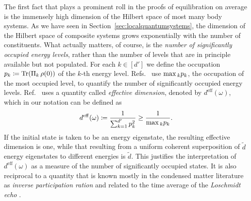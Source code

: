 \documentclass[a4paper,12pt,listof=totoc,index=totoc,bibliography=totoc,headsepline=false,headings=normal,BCOR16.153846mm,DIV12,headinclude,twoside,cleardoublepage=empty,numbers=noenddot,final]{scrreprt}
\theoremstyle{mystyle}
\numberwithin{equation}{section}
\numberwithin{figure}{section}
\numberwithin{lemma}{section}
\numberwithin{theorem}{section}
\numberwithin{corollary}{section}
\numberwithin{definition}{section}
\numberwithin{conjecture}{section}
\numberwithin{observation}{section}
\newcommand{\+}{\mkern2mu}
\newcommand{\coloneqq}{\mathrel{\vcentcolon\mkern-1.2mu=}} %
\renewcommand{\max}{\mathchoice{\operatorname*{max}}{\operatorname*{max}}{\mathrm{max}}{\mathrm{max}}} %
\newcommand{\deff}{d^{\mathrm{eff}}}
\DeclareMathOperator{\1}{\mathds{1}}
\DeclareMathOperator{\Tr}{Tr}
\begin{document}
The first fact that plays a prominent roll in the proofs of equilibration on average is the immensely high dimension of the Hilbert space of most many body systems.
As we have seen in Section~\ref{sec:localquantumsystems}, the dimension of the Hilbert space of composite systems grows exponentially with the number of constituents.
What actually matters, of course, is the \emph{number of significantly occupied energy levels}, rather than the number of levels that are in principle available but not populated.
For each $k \in [d']$ we define the occupation $p_k \coloneqq \Tr(\Pi_k\,\rho(0))$ of the $k$-th energy level.
Refs.~\cite{tasaki98,Reimann08} use $\max_k p_k$, the occupation of the most occupied level, to quantify the number of significantly occupied energy levels.
Ref.~\cite{Linden09} uses a quantity called \emph{effective dimension}, denoted by $\deff(\omega)$, which in our notation can be defined as
\begin{equation} \label{eq:effectivedimension}
  \deff(\omega) \coloneqq \frac{1}{\sum_{k=1}^{d'} p_k^2} \geq \frac{1}{\max_k p_k} .
\end{equation}
If the initial state is taken to be an energy eigenstate, the resulting effective dimension is one, while that resulting from a uniform coherent superposition of $\tilde{d}$ energy eigenstates to different energies is $\tilde{d}$.
This justifies the interpretation of $\deff(\omega)$ as a measure of the number of significantly occupied states.
It is also reciprocal to a quantity that is known mostly in the condensed matter literature as \emph{inverse participation ration} \cite{Neuenhahn10} and related to the time average of the \emph{Loschmidt echo} \cite{Levstein98,Campos10}.
\end{document}
